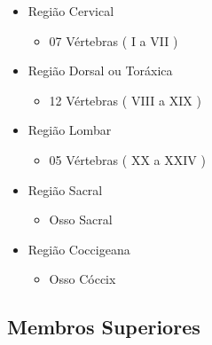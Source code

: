 \documentclass[
]{book}
\providecommand{\tightlist}{%
  \setlength{\itemsep}{0pt}\setlength{\parskip}{0pt}}
\begin{document}
\begin{itemize}
\tightlist
\item
  Região Cervical

  \begin{itemize}
  \tightlist
  \item
    07 Vértebras ( I a VII )
  \end{itemize}
\item
  Região Dorsal ou Toráxica

  \begin{itemize}
  \tightlist
  \item
    12 Vértebras ( VIII a XIX )
  \end{itemize}
\item
  Região Lombar

  \begin{itemize}
  \tightlist
  \item
    05 Vértebras ( XX a XXIV )
  \end{itemize}
\item
  Região Sacral

  \begin{itemize}
  \tightlist
  \item
    Osso Sacral
  \end{itemize}
\item
  Região Coccigeana

  \begin{itemize}
  \tightlist
  \item
    Osso Cóccix
  \end{itemize}
\end{itemize}

\hypertarget{membros-superiores}{%
\subsection{Membros Superiores}\label{membros-superiores}}
\end{document}
